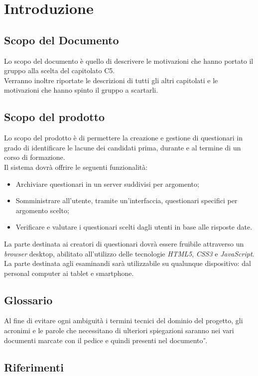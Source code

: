 \newpage
\section{Introduzione}

\subsection{Scopo del Documento}
Lo scopo del documento è quello di descrivere le motivazioni che hanno portato il gruppo alla scelta del capitolato C5. \\ Verranno inoltre riportate le descrizioni di tutti gli altri capitolati e le motivazioni che hanno spinto il gruppo a scartarli.

\subsection{Scopo del prodotto}
Lo scopo del prodotto è di permettere la creazione e gestione di questionari in grado di identificare le lacune dei candidati prima, durante e al termine di un corso di formazione.
\\Il sistema dovrà offrire le seguenti funzionalità:
\begin{itemize}
	\item
	Archiviare questionari in un server suddivisi per argomento;
	\item
	Somministrare all'utente, tramite un'interfaccia, questionari specifici per argomento scelto;
	\item
	Verificare e valutare i questionari scelti dagli utenti in base alle risposte date.
\end{itemize}
La parte destinata ai creatori di questionari dovrà essere fruibile attraverso un \textit{browser} desktop, abilitato all'utilizzo delle tecnologie \textit{HTML5}, \textit{CSS3} e \textit{JavaScript}. La parte destinata agli esaminandi sarà utilizzabile su qualunque dispositivo: dal personal computer ai tablet e smartphone.

\subsection{Glossario}
Al fine di evitare ogni ambiguità i termini tecnici del dominio del progetto, gli acronimi e le parole che necessitano di ulteriori spiegazioni saranno nei vari documenti marcate con il pedice  e quindi presenti nel documento \textit{\G}.
\subsection{Riferimenti}

